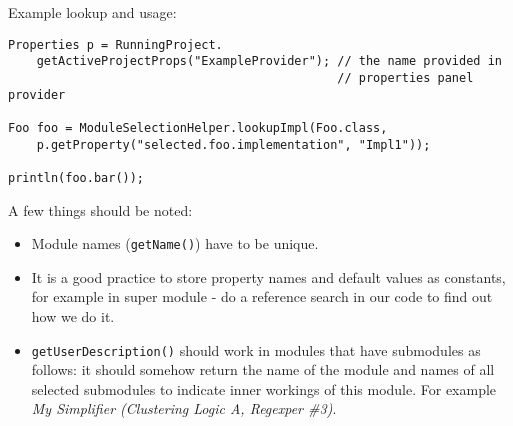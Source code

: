 \documentclass[a4paper,10pt,oneside]{article}
\begin{document}
Example lookup and usage:
\begin{verbatim}
Properties p = RunningProject.
    getActiveProjectProps("ExampleProvider"); // the name provided in
                                              // properties panel provider

Foo foo = ModuleSelectionHelper.lookupImpl(Foo.class,
    p.getProperty("selected.foo.implementation", "Impl1"));

println(foo.bar());
\end{verbatim}

\par 
  A few things should be noted:
  \begin{itemize}
    \item Module names (\texttt{getName()}) have to be unique.
    \item It is a good practice to store property names and default values as
      constants, for example in super module - do a reference search in our
      code to find out how we do it.
    \item \texttt{getUserDescription()} should work in modules that have
      submodules as follows: it should somehow return the name of the module
      and names of all selected submodules to indicate inner workings of this
      module. For example
      \textit{My Simplifier (Clustering Logic A, Regexper \#3)}.
  \end{itemize}




 
\end{document}
